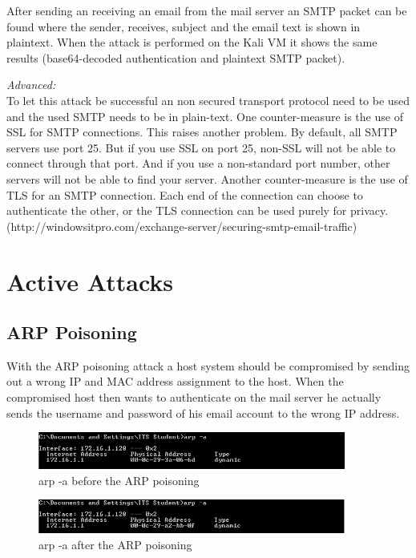 After sending an receiving an email from the mail server an \ac{SMTP} packet can be found where the sender, receives, subject and the email text is shown in plaintext. When the attack is performed on the Kali VM it shows the same results (base64-decoded authentication and plaintext \ac{SMTP} packet).

\textit{Advanced:}\\
To let this attack be successful an non secured transport protocol need to be used and the used \ac{SMTP} needs to be in plain-text.
One counter-measure is the use of \ac{SSL} for \ac{SMTP} connections. This raises another problem. By default, all \ac{SMTP} servers use port 25. But if you use \ac{SSL} on port 25, non-\ac{SSL} will not be able to connect through that port. And if you use a non-standard port number, other servers will not be able to find your server.
Another counter-measure is the use of \ac{TLS} for an \ac{SMTP} connection. Each end of the connection can choose to authenticate the other, or the \ac{TLS} connection can be used purely for privacy. (http://windowsitpro.com/exchange-server/securing-smtp-email-traffic)

\chapter{Active Attacks}

\section{ARP Poisoning}

With the \ac{ARP} poisoning attack a host system should be compromised by sending out a wrong \ac{IP} and \ac{MAC} address assignment to the host. When the compromised host then wants to authenticate on the mail server he actually sends the username and password of his email account to the wrong \ac{IP} address.

\begin{figure}[H]
	\centering
	\includegraphics[width=0.9\textwidth]{img/3_1_Arp-a_Windows.PNG}
	\caption{arp -a before the ARP poisoning}
	\label{img:arp -a before}
\end{figure}

\begin{figure}[H]
	\centering
	\includegraphics[width=0.9\textwidth]{img/3_1_arp-a_Windows_nach_poisoning.PNG}
	\caption{arp -a after the ARP poisoning}
	\label{img:arp -a after}
\end{figure}

